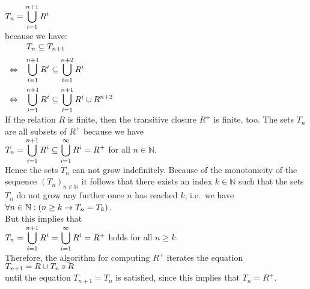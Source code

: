 \\[0.2cm]
\hspace*{1.3cm}
$\displaystyle T_n = \bigcup\limits_{i=1}^{n+1} R^i$ 
\\[0.2cm]
because we have:
\\[0.2cm]
\hspace*{1.3cm}
$
\begin{array}[t]{llcl}
                & \displaystyle T_n \subseteq T_{n+1} \\[0.2cm]
\Leftrightarrow & \displaystyle \bigcup\limits_{i=1}^{n+1} R^i \subseteq \bigcup\limits_{i=1}^{n+2} R^i \\[0.5cm]
\Leftrightarrow & \displaystyle \bigcup\limits_{i=1}^{n+1} R^i \subseteq \bigcup\limits_{i=1}^{n+1} R^i \cup R^{n+2} \\
\end{array}
$
\\[0.2cm]
If the relation  $R$ is finite, then the transitive closure $R^+$ is finite, too.  The sets $T_n$ 
are all subsets of $R^+$ because we have
\\[0.2cm]
\hspace*{1.3cm}
$\displaystyle T_n = \bigcup\limits_{i=1}^{n+1} R^i \subseteq \bigcup\limits_{i=1}^{\infty} R^i = R^+$ \quad for all $n \in \mathbb{N}$.
\\[0.2cm]
Hence the sets $T_n$ can not grow indefinitely.  Because of the monotonicity of the sequence 
$(T_n)_{n\in\mathbb{N}}$ it follows that there exists an index  $k \in \mathbb{N}$ such that the sets $T_n$ do
not grow any further once $n$ has reached $k$, i.e.~we have
\\[0.2cm]
\hspace*{1.3cm}
$\displaystyle \forall n \in \mathbb{N}:( n \geq k \rightarrow T_n = T_k)$.
\\[0.2cm]
But this implies that
\\[0.2cm]
\hspace*{1.3cm}
$\displaystyle T_n = \bigcup\limits_{i=1}^{n+1} R^i = \bigcup\limits_{i=1}^{\infty} R^i = R^+$ 
\quad holds for all $n \geq k$.
\\[0.2cm]
Therefore, the algorithm for computing  $R^+$ iterates the equation 
\\[0.2cm]
\hspace*{1.3cm}
$\displaystyle T_{n+1} = R \cup T_n \circ R$
\\[0.2cm]
until the equation  $T_{n+1} = T_n$ is satisfied, since this implies that $T_n = R^+$.


